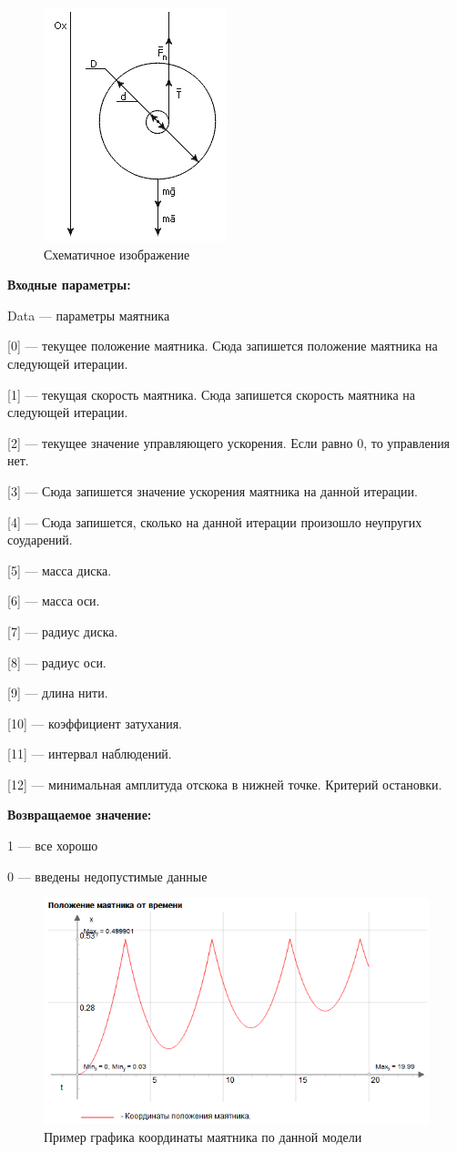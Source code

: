   \begin{figure} [h] 
   \center
   \includegraphics {MHL_PendulumOfMaxwell3.png}
   \caption{Схематичное изображение} 
   \label{img:MHL_PendulumOfMaxwell3}  
 \end{figure}

\textbf{Входные параметры:}
 
Data --- параметры маятника
 
 [0] --- текущее положение маятника. Сюда запишется положение маятника на  следующей итерации.
 
 [1] --- текущая скорость маятника. Сюда запишется скорость маятника на следующей итерации.
 
 [2] --- текущее значение управляющего ускорения. Если равно 0, то управления нет.
 
 [3] --- Сюда запишется значение ускорения маятника на данной итерации.
 
 [4] --- Сюда запишется, сколько на данной итерации произошло неупругих соударений.
 
 [5] --- масса диска.
 
 [6] --- масса оси.
 
 [7] --- радиус диска.
 
 [8] --- радиус оси.
 
 [9] --- длина нити.
 
 [10] --- коэффициент затухания.
 
 [11] --- интервал наблюдений.
 
 [12] --- минимальная амплитуда отскока в нижней точке. Критерий остановки.

\textbf{Возвращаемое значение:}
 
1 --- все хорошо
 
0 --- введены недопустимые данные

 \begin{figure} [h] 
   \center
   \includegraphics {MHL_PendulumOfMaxwell.png}
   \caption{Пример графика координаты маятника по данной модели} 
   \label{img:MHL_PendulumOfMaxwell}  
 \end{figure}